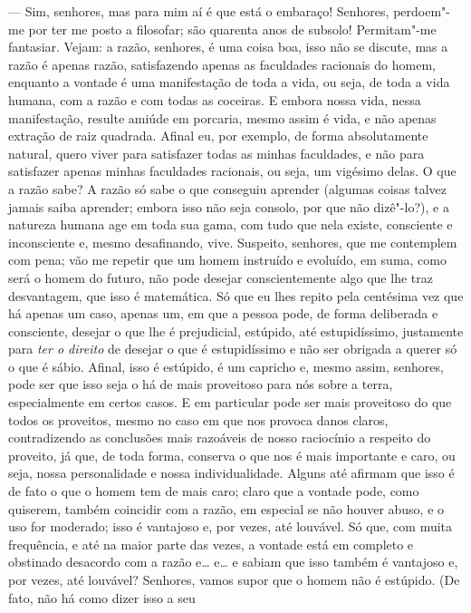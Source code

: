 --- Sim, senhores, mas para mim aí é que está o embaraço! Senhores,
perdoem"-me por ter me posto a filosofar; são quarenta anos de subsolo!
Permitam"-me fantasiar. Vejam: a razão, senhores, é uma coisa boa, isso
não se discute, mas a razão é apenas razão, satisfazendo apenas as
faculdades racionais do homem, enquanto a vontade é uma manifestação de
toda a vida, ou seja, de toda a vida humana, com a razão e com todas as
coceiras. E embora nossa vida, nessa manifestação, resulte amiúde em
porcaria, mesmo assim é vida, e não apenas extração de raiz quadrada.
Afinal eu, por exemplo, de forma absolutamente natural, quero viver para
satisfazer todas as minhas faculdades, e não para satisfazer apenas
minhas faculdades racionais, ou seja, um vigésimo delas. O que a razão
sabe? A razão só sabe o que conseguiu aprender (algumas coisas talvez
jamais saiba aprender; embora isso não seja consolo, por que não
dizê"-lo?), e a natureza humana age em toda sua gama, com tudo que nela
existe, consciente e inconsciente e, mesmo desafinando, vive. Suspeito,
senhores, que me contemplem com pena; vão me repetir que um homem
instruído e evoluído, em suma, como será o homem do futuro, não pode
desejar conscientemente algo que lhe traz desvantagem, que isso é
matemática. Só que eu lhes repito pela centésima vez que há apenas um
caso, apenas um, em que a pessoa pode, de forma deliberada e consciente,
desejar o que lhe é prejudicial, estúpido, até estupidíssimo, justamente
para \emph{ter o direito} de desejar o que é estupidíssimo e não ser
obrigada a querer só o que é sábio. Afinal, isso é estúpido, é um
capricho e, mesmo assim, senhores, pode ser que isso seja o há de mais
proveitoso para nós sobre a terra, especialmente em certos casos. E em
particular pode ser mais proveitoso do que todos os proveitos, mesmo no
caso em que nos provoca danos claros, contradizendo as conclusões mais
razoáveis de nosso raciocínio a respeito do proveito, já que, de toda
forma, conserva o que nos é mais importante e caro, ou seja, nossa
personalidade e nossa individualidade. Alguns até afirmam que isso é de
fato o que o homem tem de mais caro; claro que a vontade pode, como
quiserem, também coincidir com a razão, em especial se não houver abuso,
e o uso for moderado; isso é vantajoso e, por vezes, até louvável. Só
que, com muita frequência, e até na maior parte das vezes, a vontade
está em completo e obstinado desacordo com a razão e\ldots{} e\ldots{} e sabiam
que isso também é vantajoso e, por vezes, até louvável? Senhores, vamos
supor que o homem não é estúpido. (De fato, não há como dizer isso a seu
